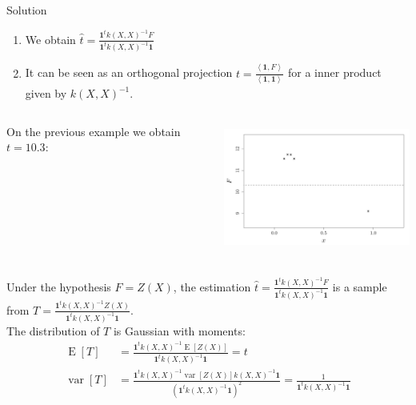 \documentclass{beamer}
\DeclareMathOperator*{\Var}{var}
\DeclareMathOperator*{\E}{E}
\newcommand\PSi[2]{{ \left \langle #1 \right \rangle}_{\! #2}}
\begin{document}
\begin{frame}{}
\begin{exampleblock}{Solution}
\begin{enumerate}
	\item We obtain $ \displaystyle \hat{t} = \frac{\mathbf{1}^t k(X,X)^{-1} F}{\mathbf{1}^t k(X,X)^{-1} \mathbf{1}}$ 
	\item It can be seen as an orthogonal projection $ \displaystyle t = \frac{\PSi{\mathbf{1}, F}{}}{\PSi{\mathbf{1},\mathbf{1}}{}}$ for a inner product given by 
	$k(X,X)^{-1}$. 
\end{enumerate}
\end{exampleblock}
\begin{columns}[c]
\begin{column}{4cm}
On the previous example we obtain $t=10.3$:
\end{column}
\begin{column}{6cm}
\hspace{-8mm} \includegraphics[height=4.2cm]{figures/R/trend_estimordinary}
\end{column}
\end{columns}
\end{frame}

\begin{frame}{}
Under the hypothesis $F=Z(X)$, the estimation $ \displaystyle \hat{t} = \frac{\mathbf{1}^t k(X,X)^{-1} F}{\mathbf{1}^t k(X,X)^{-1} \mathbf{1}}$ is a sample from $ \displaystyle T = \frac{\mathbf{1}^t k(X,X)^{-1} Z(X)}{\mathbf{1}^t k(X,X)^{-1} \mathbf{1}}$. \\ \vspace{5mm}
The distribution of $T$ is Gaussian with moments:
\begin{equation*}
\begin{split}
	\E[T] & = \frac{\mathbf{1}^t k(X,X)^{-1} \E[Z(X)]}{\mathbf{1}^t k(X,X)^{-1} \mathbf{1}} = t\\
	\Var[T] & = \frac{\mathbf{1}^t k(X,X)^{-1} \Var[Z(X)] k(X,X)^{-1} \mathbf{1}}{(\mathbf{1}^t k(X,X)^{-1} \mathbf{1})^2} = \frac{1}{\mathbf{1}^t k(X,X)^{-1} \mathbf{1}}\\
\end{split}
\end{equation*}
\end{frame}
\end{document}
